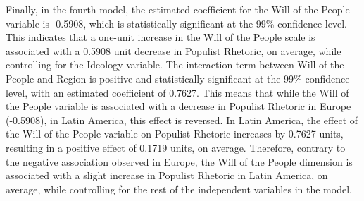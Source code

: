 \documentclass[12pt,letterpaper]{article}
\begin{document}
Finally, in the fourth model, the estimated coefficient for the Will of the People variable is -0.5908, which is statistically significant at the 99\% confidence level. This indicates that a one-unit increase in the Will of the People scale is associated with a 0.5908 unit decrease in Populist Rhetoric, on average, while controlling for the Ideology variable. The interaction term between Will of the People and Region is positive and statistically significant at the 99\% confidence level, with an estimated coefficient of 0.7627. This means that while the Will of the People variable is associated with a decrease in Populist Rhetoric in Europe (-0.5908), in Latin America, this effect is reversed. In Latin America, the effect of the Will of the People variable on Populist Rhetoric increases by 0.7627 units, resulting in a positive effect of 0.1719 units, on average. Therefore, contrary to the negative association observed in Europe, the Will of the People dimension is associated with a slight increase in Populist Rhetoric in Latin America, on average, while controlling for the rest of the independent variables in the model.
\end{document}
